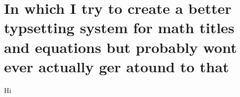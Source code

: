 \documentclass[10pt]{article}
\begin{document}
\section{In which I try to create a better typsetting system for math titles and equations but probably wont ever actually ger atound to that}
Hi \lipsum[2]
\end{document}
